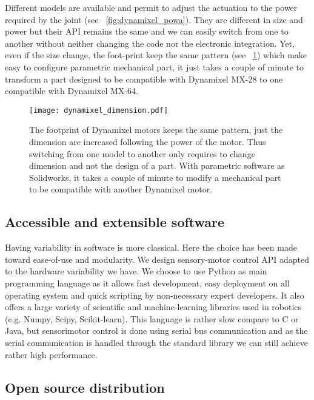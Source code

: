 Different models are available and permit to adjust the actuation to the power required by the joint (see \figurename~\ref{fig:dynamixel_powa}). They are different in size and power but their API remains the same and we can easily switch from one to another without neither changing the code nor the electronic integration. Yet, even if the size change, the foot-print keep the same pattern (see \figurename~\ref{fig:dynamixel_dimension}) which make easy to configure parametric mechanical part, it just takes a couple of minute to transform a part designed to be compatible with Dynamixel MX-28 to one compatible with Dynamixel MX-64.


\begin{figure}[tb]
    \begin{center}
        \texttt{[image: dynamixel\_dimension.pdf]}
    \end{center}
    \caption{The footprint of Dynamixel motors keeps the same pattern, just the dimension are increased following the power of the motor. Thus switching from one model to another only requires to change dimension and not the design of a part. With parametric software as Solidworks, it takes a couple of minute to modify a mechanical part to be compatible with another Dynamixel motor.}
    \label{fig:dynamixel_dimension}
\end{figure}


\subsection{Accessible and extensible software} %

Having variability in software is more classical. Here the choice has been made toward ease-of-use and modularity. We design sensory-motor control API adapted to the hardware variability we have. We choose to use Python as main programming language as it allows fast development, easy deployment on all operating system and quick scripting by non-necessary expert developers. It also offers a large variety of scientific and machine-learning libraries used in robotics (e.g. Numpy, Scipy, Scikit-learn).
This language is rather slow compare to C or Java, but sensorimotor control is done using serial bus communication and as the serial communication is handled through the standard library we can still achieve rather high performance.

\subsection{Open source distribution} %

